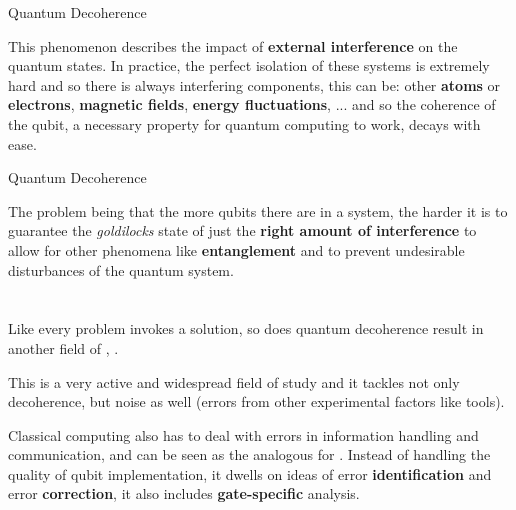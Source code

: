 \documentclass[aspectratio=43]{beamer}
\begin{document}
\begin{frame}{Quantum Decoherence}
    \begin{card}
        This phenomenon describes the impact of \textbf{external interference} on the quantum states. In practice, the perfect isolation of these systems is extremely hard and so there is always interfering components, this can be: other \textbf{atoms} or \textbf{electrons}, \textbf{magnetic fields}, \textbf{energy fluctuations}, ... and so the coherence of the qubit, a necessary property for quantum computing to work, decays with ease.
    \end{card}
\pagenumber
\end{frame}
\begin{frame}{Quantum Decoherence}
    \begin{card}
        The problem being that the more qubits there are in a system, the harder it is to guarantee the \textit{goldilocks} state of just the \textbf{right amount of interference} to allow for other phenomena like \textbf{entanglement} and to prevent undesirable disturbances of the quantum system.
    \end{card}
\pagenumber
\end{frame}


\section{\qec}
\begin{frame}{\qec}
    \begin{card}
        Like every problem invokes a solution, so does quantum decoherence result in another field of \qc, \textbf{\qec}.
    \end{card}
    \begin{card}
        This is a very active and widespread field of study and it tackles not only decoherence, but noise as well (errors from other experimental factors like tools). 
    \end{card}
\pagenumber
\end{frame}

\begin{frame}{\qec}
    \begin{card}
        Classical computing also has to deal with errors in information handling and communication, and \qec can be seen as the analogous for \qc. Instead of handling the quality of qubit implementation, it dwells on ideas of error \textbf{identification} and error \textbf{correction}, it also includes \textbf{gate-specific} analysis.
    \end{card}
\pagenumber
\end{frame}
\end{document}
